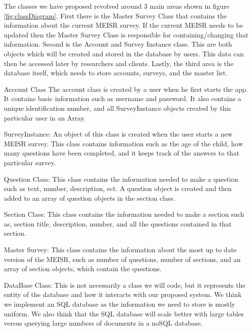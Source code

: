 The classes we have proposed revolved around 3 main areas shown in figure \ref{fig:classDiagram}. First there is the Master Survey Class that contains the information about the current MEISR survey. If the current MEISR needs to be updated then the Master Survey Class is responsible for containing/changing that information. Second is the Account and Survey Instance class. This are both objects which will be created and stored in the database by users. This data can then be accessed later by researchers and clients. Lastly, the third area is the database itself, which needs to store accounts, surveys, and the master list.


Account Class
	The account class is created by a user when he first starts the app. It contains basic information such as username and password. It also contains a unique identification number, and all SurveyInstance objects created by this particular user in an Array.

SurveyInstance:
	An object of this class is created when the user starts a new MEISR survey. This class contains information such as the age of the child, how many questions have been completed, and it keeps track of the answers to that particular survey.

Question Class:
	This class contains the information needed to make a question such as text, number, description, ect. A question object is created and then added to an array of question objects in the section class.

Section Class:
	This class contains the information needed to make a section such as, section title, description, number, and all the questions contained in that section.

Master Survey:
	This class contains the information about the most up to date version of the MEISR, such as number of questions, number of sections, and an array of section objects, which contain the questions.

DataBase Class:
	This is not necessarily a class we will code, but it represents the entity of the database and how it interacts with our proposed system. We think we implement an SQL database as the information we need to store is mostly uniform. We also think that the SQL database will scale better with large tables versus querying large numbers of documents in a noSQL database.



